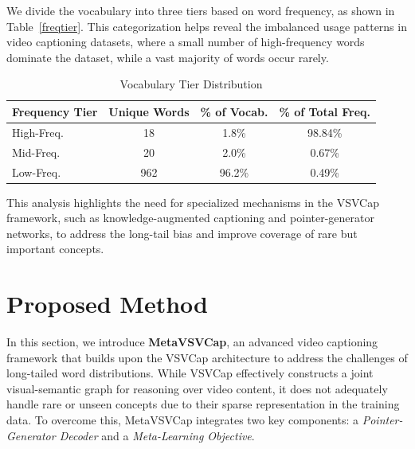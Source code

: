 \documentclass[journal]{IEEEtran}
\begin{document}
We divide the vocabulary into three tiers based on word frequency, as shown in Table~\ref{freqtier}. This categorization helps reveal the imbalanced usage patterns in video captioning datasets, where a small number of high-frequency words dominate the dataset, while a vast majority of words occur rarely.

\begin{table}[!ht]
\centering
\caption{Vocabulary Tier Distribution}
\label{freqtier}
\begin{tabular}{@{}lccc@{}}
\hline
\textbf{Frequency Tier} & \textbf{Unique Words} & \textbf{\% of Vocab.} & \textbf{\% of Total Freq.} \\
\hline
High-Freq.          & 18                    & 1.8\%                      & 98.84\%                         \\
Mid-Freq.           & 20                    & 2.0\%                      & 0.67\%                          \\
Low-Freq.           & 962                   & 96.2\%                     & 0.49\%                          \\
\hline
\end{tabular}
\label{tab:vocab_distribution}
\end{table}

This analysis highlights the need for specialized mechanisms in the VSVCap framework, such as knowledge-augmented captioning and pointer-generator networks, to address the long-tail bias and improve coverage of rare but important concepts.


\section{Proposed Method}

In this section, we introduce \textbf{MetaVSVCap}, an advanced video captioning framework that builds upon the VSVCap architecture to address the challenges of long-tailed word distributions. While VSVCap effectively constructs a joint visual-semantic graph for reasoning over video content, it does not adequately handle rare or unseen concepts due to their sparse representation in the training data. To overcome this, MetaVSVCap integrates two key components: a \textit{Pointer-Generator Decoder} and a \textit{Meta-Learning Objective}.
\end{document}
